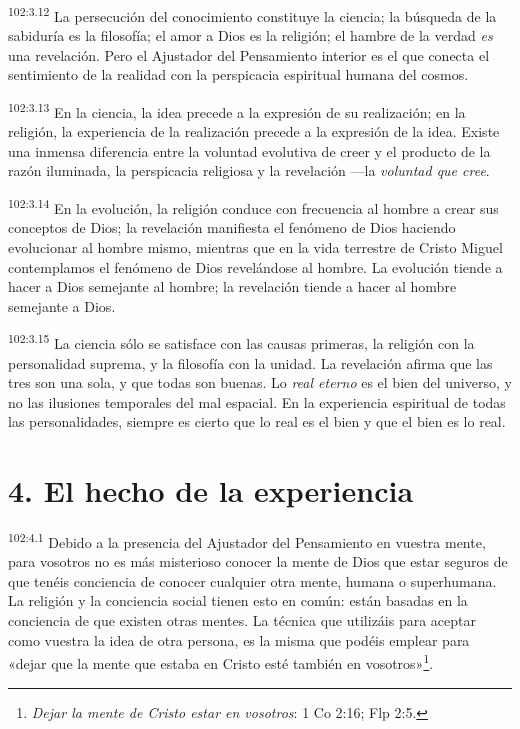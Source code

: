 \par
\textsuperscript{102:3.12} La persecución del conocimiento constituye la ciencia; la búsqueda de la sabiduría es la filosofía; el amor a Dios es la religión; el hambre de la verdad \textit{es} una revelación. Pero el Ajustador del Pensamiento interior es el que conecta el sentimiento de la realidad con la perspicacia espiritual humana del cosmos.

\par
\textsuperscript{102:3.13} En la ciencia, la idea precede a la expresión de su realización; en la religión, la experiencia de la realización precede a la expresión de la idea. Existe una inmensa diferencia entre la voluntad evolutiva de creer y el producto de la razón iluminada, la perspicacia religiosa y la revelación ---la \textit{voluntad que cree}.

\par
\textsuperscript{102:3.14} En la evolución, la religión conduce con frecuencia al hombre a crear sus conceptos de Dios; la revelación manifiesta el fenómeno de Dios haciendo evolucionar al hombre mismo, mientras que en la vida terrestre de Cristo Miguel contemplamos el fenómeno de Dios revelándose al hombre. La evolución tiende a hacer a Dios semejante al hombre; la revelación tiende a hacer al hombre semejante a Dios.

\par
\textsuperscript{102:3.15} La ciencia sólo se satisface con las causas primeras, la religión con la personalidad suprema, y la filosofía con la unidad. La revelación afirma que las tres son una sola, y que todas son buenas. Lo \textit{real eterno} es el bien del universo, y no las ilusiones temporales del mal espacial. En la experiencia espiritual de todas las personalidades, siempre es cierto que lo real es el bien y que el bien es lo real.

\section*{4. El hecho de la experiencia}
\par
\textsuperscript{102:4.1} Debido a la presencia del Ajustador del Pensamiento en vuestra mente, para vosotros no es más misterioso conocer la mente de Dios que estar seguros de que tenéis conciencia de conocer cualquier otra mente, humana o superhumana. La religión y la conciencia social tienen esto en común: están basadas en la conciencia de que existen otras mentes. La técnica que utilizáis para aceptar como vuestra la idea de otra persona, es la misma que podéis emplear para «dejar que la mente que estaba en Cristo esté también en vosotros»\footnote{\textit{Dejar la mente de Cristo estar en vosotros}: 1 Co 2:16; Flp 2:5.}.

